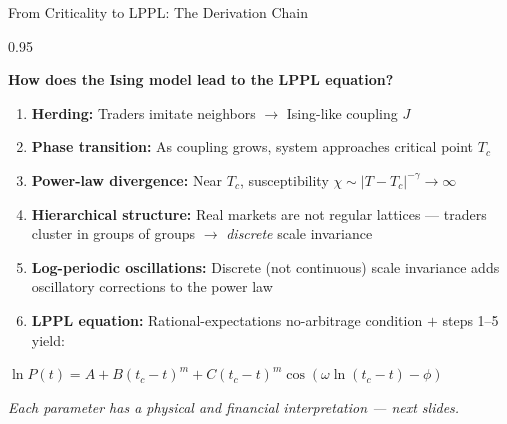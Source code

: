 \documentclass[9pt, aspectratio=169, t]{beamer}
\begin{document}
\begin{frame}{From Criticality to LPPL: The Derivation Chain}
    \begin{cminipage}{0.95\textwidth}
    {\footnotesize
    \begin{center}
        \textcolor{MainBlue}{\textbf{How does the Ising model lead to the LPPL equation?}}
    \end{center}
    \vspace{2mm}
    \begin{enumerate}\setlength{\itemsep}{4pt}
        \item[\textcolor{MainBlue}{\textbf{1}}] \textbf{Herding:} Traders imitate neighbors $\to$ Ising-like coupling $J$
        \item[\textcolor{MainBlue}{\textbf{2}}] \textbf{Phase transition:} As coupling grows, system approaches critical point $T_c$
        \item[\textcolor{MainBlue}{\textbf{3}}] \textbf{Power-law divergence:} Near $T_c$, susceptibility $\chi \sim |T - T_c|^{-\gamma} \to \infty$
        \item[\textcolor{MainBlue}{\textbf{4}}] \textbf{Hierarchical structure:} Real markets are not regular lattices --- traders cluster in groups of groups $\to$ \textit{discrete} scale invariance
        \item[\textcolor{Crimson}{\textbf{5}}] \textbf{Log-periodic oscillations:} Discrete (not continuous) scale invariance adds oscillatory corrections to the power law
        \item[\textcolor{Crimson}{\textbf{6}}] \textbf{LPPL equation:} Rational-expectations no-arbitrage condition $+$ steps 1--5 yield:
    \end{enumerate}
    \vspace{2mm}
    \begin{center}
        $\boxed{\ln P(t) = A + B(t_c - t)^m + C(t_c - t)^m \cos(\omega \ln(t_c - t) - \phi)}$
    \end{center}
    \vspace{1mm}
    \begin{center}
        \textcolor{MediumGray}{\textit{Each parameter has a physical and financial interpretation --- next slides.}}
    \end{center}
    }
    \end{cminipage}
\end{frame}

\end{document}
